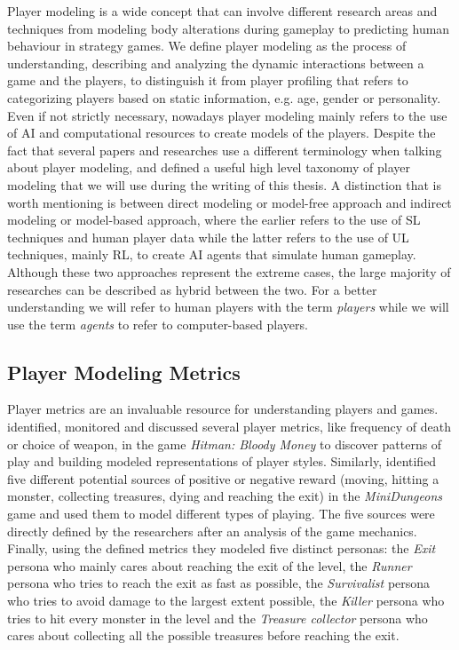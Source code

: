 Player modeling is a wide concept that can involve different research areas and techniques from modeling body alterations during gameplay to predicting human behaviour in strategy games. We define player modeling as the process of understanding, describing and analyzing the dynamic interactions between a game and the players, to distinguish it from player profiling that refers to categorizing players based on static information, e.g. age, gender or personality. Even if not strictly necessary, nowadays player modeling mainly refers to the use of \acs{AI} and computational resources to create models of the players. Despite the fact that several papers and researches use a different terminology when talking about player modeling, \textcite{smith_inclusive_2011} and \textcite{yannakakis_player_2013} defined a useful high level taxonomy of player modeling that we will use during the writing of this thesis. A distinction that is worth mentioning is between direct modeling or model-free approach and indirect modeling or model-based approach, where the earlier refers to the use of \acf{SL} techniques and human player data while the latter refers to the use of \acf{UL} techniques, mainly \acs{RL}, to create \acs{AI} agents that simulate human gameplay. Although these two approaches represent the extreme cases, the large majority of researches can be described as hybrid between the two. For a better understanding we will refer to human players with the term \textit{players} while we will use the term \textit{agents} to refer to computer-based players.

\subsection{Player Modeling Metrics} \label{Player_Modeling_Metrics}
Player metrics are an invaluable resource for understanding players and games. \textcite{tychsen_defining_2008} identified, monitored and discussed several player metrics, like frequency of death or choice of weapon, in the game \textit{Hitman: Bloody Money} to discover patterns of play and building modeled representations of player styles. 
Similarly, \textcite{holmgard_evolving_2014} identified five different potential sources of positive or negative reward (moving, hitting a monster, collecting treasures, dying and reaching the exit) in the \textit{MiniDungeons} game and used them to model different types of playing. The five sources were directly defined by the researchers after an analysis of the game mechanics. Finally, using the defined metrics they modeled five distinct personas: the \textit{Exit} persona who mainly cares about reaching the exit of the level, the \textit{Runner} persona who tries to reach the exit as fast as possible, the \textit{Survivalist} persona who tries to avoid damage to the largest extent possible, the \textit{Killer} persona who tries to hit every monster in the level and the \textit{Treasure collector} persona who cares about collecting all the possible treasures before reaching the exit.

